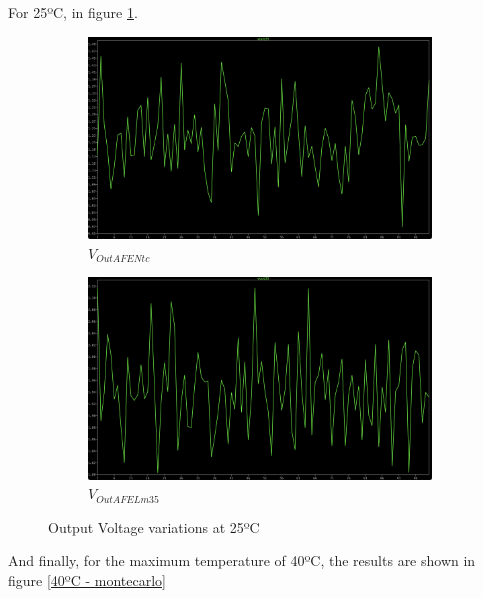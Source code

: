 \documentclass[12pt]{article}
\begin{document}
    For 25ºC, in figure \ref{25ºC - montecarlo}.

    \begin{figure}[H]
        \centering
        \begin{subfigure}{0.45\textwidth}
            \centering
            \includegraphics[width=\textwidth]{images/vntc25.png}
            \caption{ $V_{OutAFENtc}$ }
        \end{subfigure}\hfill
        \begin{subfigure}{0.45\textwidth}
            \centering
            \includegraphics[width=\textwidth]{images/vlm25.png}
            \caption{$V_{OutAFELm35}$}
        \end{subfigure}
        \caption{Output Voltage variations at 25ºC}
        \label{25ºC - montecarlo}
    \end{figure}

    And finally, for the maximum temperature of 40ºC, the results are shown in figure \ref{40ºC - montecarlo}
\end{document}
